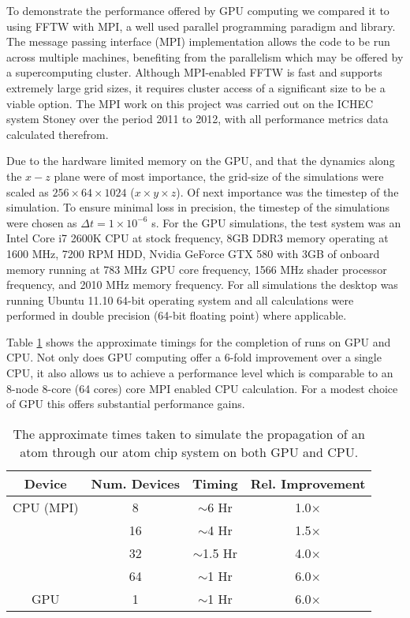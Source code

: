 To demonstrate the performance offered by GPU computing we compared it to using FFTW with MPI, a well used parallel programming paradigm and library. The message passing interface (MPI) implementation allows the code to be run across multiple machines, benefiting from the parallelism which may be offered by a supercomputing cluster. Although MPI-enabled FFTW is fast and supports extremely large grid sizes, it requires cluster access of a significant size to be a viable option. The MPI work on this project was carried out on the ICHEC system Stoney over the period 2011 to 2012, with all performance metrics data calculated therefrom.



Due to the hardware limited memory on the GPU, and that the dynamics along the $x-z$ plane were of most importance, the grid-size of the simulations were scaled as $256\times 64\times1024$ ($x\times y\times z$). Of next importance was the timestep of the simulation.  To ensure minimal loss in precision, the timestep of the simulations were chosen as $\Delta t = 1\times 10^{-6}$ s. For the GPU simulations, the test system was an Intel Core i7 2600K CPU at stock frequency, 8GB DDR3 memory operating at 1600 MHz, 7200 RPM HDD, Nvidia GeForce GTX 580 with 3GB of onboard memory running at 783 MHz GPU core frequency, 1566 MHz shader processor frequency, and 2010 MHz memory frequency. For all simulations the desktop was running Ubuntu 11.10 64-bit operating system and all calculations were performed in double precision (64-bit floating point) where applicable.

Table \ref{tbl:timing} shows the approximate timings for the completion of runs on GPU and CPU. Not only does GPU computing offer a 6-fold improvement over a single CPU, it also allows us to achieve a performance level which is comparable to an 8-node 8-core (64 cores) core MPI enabled CPU calculation. For a modest choice of GPU this offers substantial performance gains.

\begin{table}[tb]
  \begin{center}
    \begin{tabular}{|c||c|c|c|}
      \hline
      Device & Num. Devices & Timing  & Rel. Improvement \\ \hline
      CPU (MPI) & 8 & $\sim$6 Hr & 1.0$\times$ \\
      & 16 & $\sim$4 Hr & 1.5$\times$ \\
      & 32 & $\sim$1.5 Hr & 4.0$\times$ \\
      & 64 & $\sim$1 Hr & 6.0$\times$ \\ \hline
      GPU & 1 & $\sim$1 Hr & 6.0$\times$ \\ \hline
    \end{tabular}
  \end{center}
   \caption{The approximate times taken to simulate the propagation of an atom through our atom chip system on both GPU and CPU.}
   \label{tbl:timing}
\end{table}



